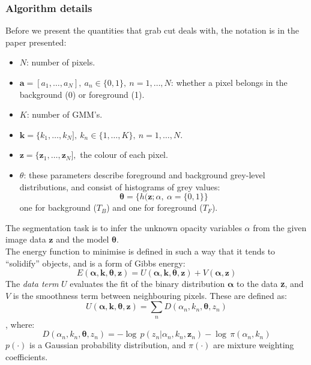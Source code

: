 \documentclass[a4paper]{article}
\begin{document}
\subsubsection{Algorithm details}

Before we present the quantities that grab cut deals with, the notation is in the paper presented:
\begin{itemize}
    \item $N$: number of pixels.
    \item $\textbf{a}=[a_1,\ldots,a_N],\ a_n \in \{0,1\}, \ n=1,\ldots,N$: whether a pixel belongs in the background (0) or foreground (1).
    \item $K$: number of GMM's.
    \item $\textbf{k}=\{k_1,\ldots,k_N],\ k_n \in \{1,\ldots,K\}, \ n=1,\ldots,N$.
    \item $\textbf{z}=\{\textbf{z}_1,\ldots,\textbf{z}_N],$ the colour of each pixel.
    \item $\theta$: these parameters describe foreground and background grey-level distributions, and consist of histograms of grey values:
    \[
    \boldsymbol{\theta} = \{h(\textbf{z};\alpha, \ \alpha=\{0,1\} \}
    \]
    one for background ($T_B$) and one for foreground ($T_F$).
\end{itemize}
The segmentation task is to infer the unknown opacity variables
$\alpha$ from the given image data $\textbf{z}$ and the model $\boldsymbol{\theta}$.\\
The energy function to minimise is defined in such a way that it tends to ``solidify'' objects, and is a form of Gibbs energy:
\begin{equation}
    E(\boldsymbol{\alpha}, \textbf{k}, \boldsymbol{\theta}, \textbf{z}) = U(\boldsymbol{\alpha}, \textbf{k}, \boldsymbol{\theta}, \textbf{z}) +V(\boldsymbol{\alpha}, \textbf{z})
\end{equation}
The \textit{data term }$U$ evaluates the fit of the binary distribution $\boldsymbol{\alpha}$ to the
data \textbf{z}, and $V$ is the smoothness term between neighbouring pixels. These are defined as:
\begin{equation}
    U(\boldsymbol{\alpha}, \textbf{k}, \boldsymbol{\theta}, \textbf{z}) =
    \sum\limits_{n}{D(\alpha_n, k_n,\boldsymbol{\theta},z_n)}
\end{equation}
, where:
\[
D(\alpha_n, k_n,\boldsymbol{\theta},z_n) = -\log\, p\left(z_n \left|\alpha_n,k_n,\textbf{z}_n \right. \right) -\log\, \pi (\alpha_n, k_n)
\]
$p(\cdot)$ is a Gaussian probability distribution, and $\pi(\cdot)$ are mixture weighting coefficients.
\end{document}
